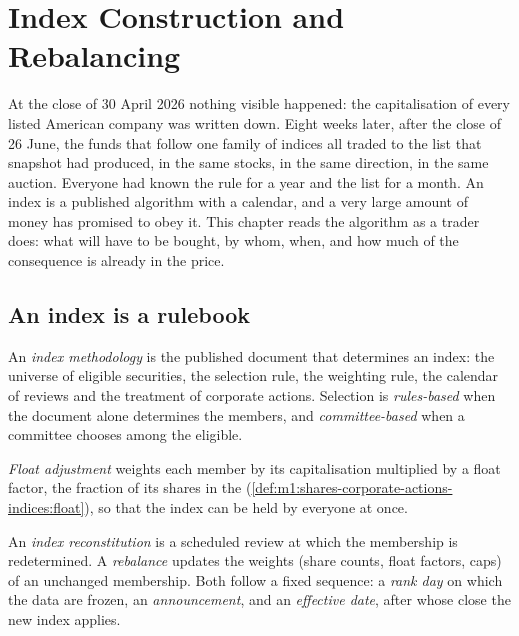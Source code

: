 \chapter{Index Construction and Rebalancing}\label{ch:m1:index-construction-and-rebalancing}

At the close of 30 April 2026 nothing visible happened: the capitalisation of
every listed American company was written down. Eight weeks later, after the
close of 26 June, the funds that follow one family of indices all traded to
the list that snapshot had produced, in the same stocks, in the same
direction, in the same auction. Everyone had known the rule for a year and the
list for a month. An index is a published algorithm with a calendar, and a
very large amount of money has promised to obey it. This chapter reads the
algorithm as a trader does: what will have to be bought, by whom, when, and
how much of the consequence is already in the price.

\section{An index is a rulebook}

\begin{definition}\label{def:m1:index-construction-and-rebalancing:methodology}
An \emph{index methodology} is the published
document that determines an index: the universe of eligible securities, the
selection rule, the weighting rule, the calendar of reviews and the treatment
of corporate actions. Selection is \emph{rules-based} when the document
alone determines the members, and \emph{committee-based} when a committee
chooses among the eligible.
\end{definition}

\begin{definition}\label{def:m1:index-construction-and-rebalancing:floatadj}
\emph{Float adjustment} weights each member by its
capitalisation multiplied by a float factor, the fraction of its shares in
the  (\cref{def:m1:shares-corporate-actions-indices:float}), so
that the index can be held by everyone at once.
\end{definition}

\begin{definition}\label{def:m1:index-construction-and-rebalancing:recon}
An \emph{index reconstitution} is a scheduled
review at which the membership is redetermined. A \emph{rebalance} updates
the weights (share counts, float factors, caps) of an unchanged membership.
Both follow a fixed sequence: a \emph{rank day} on which the data are
frozen, an \emph{announcement}, and an \emph{effective date}, after whose
close the new index applies.
\end{definition}

